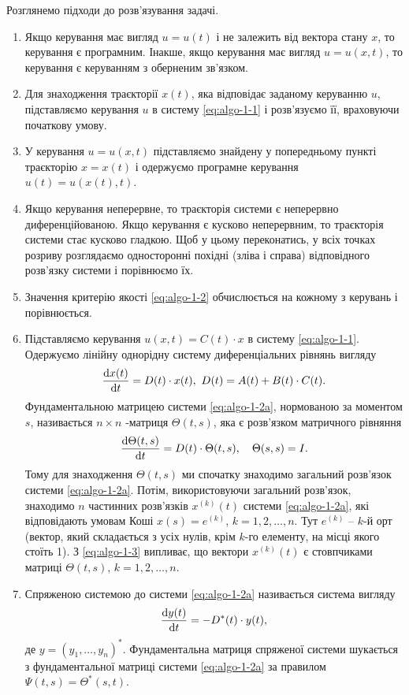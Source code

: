 \begin{algorithm}
    \label{algo-1-1}
	Розглянемо підходи до розв'язування задачі.
	\begin{enumerate}
		\item Якщо керування має вигляд $u = u(t)$ і не залежить від вектора стану $x$, то керування є програмним. Інакше, якщо керування має вигляд $u = u(x, t)$, то  керування  є керуванням з оберненим зв'язком.
		\item Для знаходження траєкторії $x(t)$, яка відповідає заданому керуванню $u$, підставляємо керування $u$ в систему \eqref{eq:algo-1-1} і розв'язуємо її, враховуючи початкову умову.
		\item У керування $u = u(x, t)$ підставляємо знайдену у попередньому пункті траєкторію $x = x(t)$ і одержуємо програмне керування $u(t) = u(x(t), t)$.
		\item Якщо керування неперервне, то траєкторія системи є неперервно диференційованою. Якщо керування є  кусково неперервним, то траєкторія системи стає кусково гладкою. Щоб у цьому переконатись, у всіх точках розриву %
		розглядаємо односторонні похідні (зліва і справа) відповідного розв'язку системи і порівнюємо їх. 
		\item Значення критерію якості \eqref{eq:algo-1-2} обчислюється на кожному з керувань і порівнюється.
		\item Підставляємо керування $u(x,t) = C(t) \cdot x$ в систему \eqref{eq:algo-1-1}. Одержуємо лінійну однорідну систему диференціальних рівнянь вигляду 
		\begin{equation}
		    \label{eq:algo-1-2a}
		\frac{\mathop{}\!\mathrm{d} x(t)}{\mathop{}\!\mathrm{d} t} = D (t) \cdot x(t), \ D(t) = A(t) + B(t) \cdot C(t).
		\end{equation}
		Фундаментальною матрицею системи \eqref{eq:algo-1-2a}, нормованою за моментом $s$, називається  $n \times n$ -матриця $\Theta(t, s)$, яка є розв'язком матричного рівняння \begin{equation}
		    \label{eq:algo-1-3}
		    \frac{\mathop{}\!\mathrm{d} \Theta(t, s)}{\mathop{}\!\mathrm{d} t} = D(t) \cdot \Theta(t, s), \quad \Theta(s, s) = I.
		\end{equation}
		Тому для знаходження $\Theta(t, s)$ ми спочатку знаходимо загальний розв'язок системи \eqref{eq:algo-1-2a}. Потім, використовуючи загальний розв'язок, знаходимо $n$ частинних розв'язків $x^{(k)}(t)$ системи \eqref{eq:algo-1-2a}, які відповідають умовам Коші $x(s) = e^{(k)}$, $k=1,2,\ldots,n$. Тут $e^{(k)}$ -- $k$-й орт (вектор, який складається з усіх нулів, крім $k$-го елементу, на місці якого стоїть 1). З \eqref{eq:algo-1-3} випливає, що вектори $x^{(k)}(t)$ є стовпчиками матриці $\Theta(t, s)$, $k=1,2,\ldots,n$. 
		\item Спряженою системою до системи \eqref{eq:algo-1-2a} називається система вигляду
		\begin{equation}
		    \label{eq:algo-1-4}
		    \frac{\mathop{}\!\mathrm{d} y(t)}{\mathop{}\!\mathrm{d} t} = - D^*(t) \cdot y(t),
		\end{equation}
		де $y = (y_1, \ldots, y_n)^*$. Фундаментальна матриця спряженої системи шукається з фундаментальної матриці системи \eqref{eq:algo-1-2a} за правилом $\Psi(t,s) = \Theta^*(s,t)$.
	\end{enumerate}
\end{algorithm}

